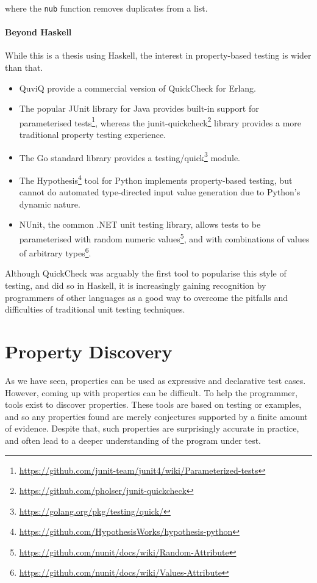 \noindent where the \verb|nub| function removes duplicates from a
list.

\paragraph{Beyond Haskell}
While this is a thesis using Haskell, the interest in property-based testing is
wider than that.

\begin{itemize}
\item QuviQ provide a commercial version of QuickCheck for
  Erlang\cite{arts2006}.
\item The popular JUnit library for Java provides built-in support for parameterised
  tests\footnote{\url{https://github.com/junit-team/junit4/wiki/Parameterized-tests}},
  whereas the
  junit-quickcheck\footnote{\url{https://github.com/pholser/junit-quickcheck}}
  library provides a more traditional property testing experience.
\item The Go standard library provides a
  testing/quick\footnote{\url{https://golang.org/pkg/testing/quick/}} module.
\item The
  Hypothesis\footnote{\url{https://github.com/HypothesisWorks/hypothesis-python}}
  tool for Python implements property-based testing, but cannot do automated
  type-directed input value generation due to Python's dynamic nature.
\item NUnit, the common .NET unit testing library, allows tests to be
  parameterised with random numeric
  values\footnote{\url{https://github.com/nunit/docs/wiki/Random-Attribute}},
  and with combinations of values of arbitrary
  types\footnote{\url{https://github.com/nunit/docs/wiki/Values-Attribute}}.
\end{itemize}

Although QuickCheck was arguably the first tool to popularise this style of
testing, and did so in Haskell, it is increasingly gaining recognition by
programmers of other languages as a good way to overcome the pitfalls and
difficulties of traditional unit testing techniques.

\section{Property Discovery}
\label{sec:property_testing-gen}

As we have seen, properties can be used as expressive and declarative
test cases.  However, coming up with properties can be difficult.  To
help the programmer, tools exist to discover properties.  These tools
are based on testing or examples, and so any properties found are
merely conjectures supported by a finite amount of evidence.  Despite
that, such properties are surprisingly accurate in practice, and often
lead to a deeper understanding of the program under test.

